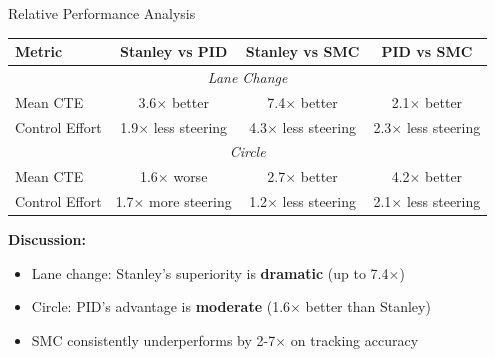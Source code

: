 \documentclass[10pt]{beamer}
\begin{document}
\begin{frame}{Relative Performance Analysis}
  \begin{table}
    \centering
    \footnotesize
    \begin{tabular}{lccc}
      \toprule
      \textbf{Metric} & \textbf{Stanley vs PID} & \textbf{Stanley vs SMC} & \textbf{PID vs SMC} \\
      \midrule
      \multicolumn{4}{c}{\textit{Lane Change}} \\
      \midrule
      Mean CTE & 3.6$\times$ better & 7.4$\times$ better & 2.1$\times$ better \\
      Control Effort & 1.9$\times$ less steering & 4.3$\times$ less steering & 2.3$\times$ less steering \\
      \midrule
      \multicolumn{4}{c}{\textit{Circle}} \\
      \midrule
      Mean CTE & 1.6$\times$ worse & 2.7$\times$ better & 4.2$\times$ better \\
      Control Effort & 1.7$\times$ more steering & 1.2$\times$ less steering & 2.1$\times$ less steering \\
      \bottomrule
    \end{tabular}
  \end{table}

  \vspace{0.2cm}

  \textbf{Discussion:}
  \begin{itemize}
    \item Lane change: Stanley's superiority is \textbf{dramatic} (up to 7.4$\times$)
    \item Circle: PID's advantage is \textbf{moderate} (1.6$\times$ better than Stanley)
    \item SMC consistently underperforms by 2-7$\times$ on tracking accuracy
  \end{itemize}
\end{frame}
\end{document}
